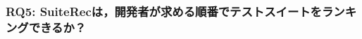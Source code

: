 \documentclass[12pt]{jarticle} %
\begin{document}
\subsubsection{RQ5: {\sf SuiteRec}は，開発者が求める順番でテストスイートをランキングできるか？}

\end{document}
